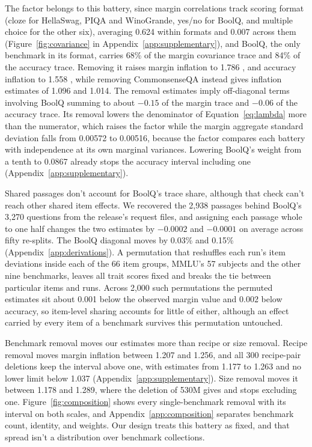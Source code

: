 The factor belongs to this battery, since margin correlations track scoring format (cloze for HellaSwag, PIQA and WinoGrande, yes/no for BoolQ, and multiple choice for the other six), averaging 0.624 within formats and 0.007 across them (Figure~\ref{fig:covariance} in Appendix~\ref{app:supplementary}), and BoolQ, the only benchmark in its format, carries 68\% of the margin covariance trace and 84\% of the accuracy trace. Removing it raises margin inflation to 1.786 , and accuracy inflation to 1.558 , while removing CommonsenseQA instead gives inflation estimates of 1.096 and 1.014. The removal estimates imply off-diagonal terms involving BoolQ summing to about $-0.15$ of the margin trace and $-0.06$ of the accuracy trace. Its removal lowers the denominator of Equation~\ref{eq:lambda} more than the numerator, which raises the factor while the margin aggregate standard deviation falls from 0.00572 to 0.00516, because the factor compares each battery with independence at its own marginal variances. Lowering BoolQ's weight from a tenth to 0.0867 already stops the accuracy interval including one (Appendix~\ref{app:supplementary}).

Shared passages don't account for BoolQ's trace share, although that check can't reach other shared item effects. We recovered the 2,938 passages behind BoolQ's 3,270 questions from the release's request files, and assigning each passage whole to one half changes the two estimates by $-0.0002$ and $-0.0001$ on average across fifty re-splits. The BoolQ diagonal moves by 0.03\% and 0.15\% (Appendix~\ref{app:derivations}). A permutation that reshuffles each run's item deviations inside each of the 66 item groups, MMLU's 57 subjects and the other nine benchmarks, leaves all trait scores fixed and breaks the tie between particular items and runs. Across 2,000 such permutations the permuted estimates sit about 0.001 below the observed margin value and 0.002 below accuracy, so item-level sharing accounts for little of either, although an effect carried by every item of a benchmark survives this permutation untouched.

Benchmark removal moves our estimates more than recipe or size removal. Recipe removal moves margin inflation between 1.207 and 1.256, and all 300 recipe-pair deletions keep the interval above one, with estimates from 1.177 to 1.263 and no lower limit below 1.037 (Appendix~\ref{app:supplementary}). Size removal moves it between 1.178 and 1.289, where the deletion of 530M gives  and stops excluding one. Figure~\ref{fig:composition} shows every single-benchmark removal with its interval on both scales, and Appendix~\ref{app:composition} separates benchmark count, identity, and weights. Our design treats this battery as fixed, and that spread isn't a distribution over benchmark collections.

